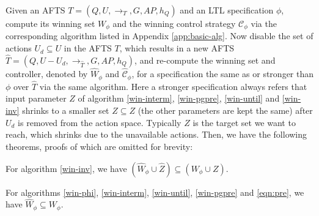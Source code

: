 Given an AFTS $ T = (Q,U,\rightarrow_T,G,AP,h_Q) $ and an LTL specification $ \phi $, compute its winning set $ W_{\phi} $ and the winning control strategy $ \mathcal{C}_{\phi} $  via the corresponding algorithm listed in Appendix \ref{app:basic-alg}. Now disable the set of actions $ U_d \subseteq U$ in the AFTS $ T $, which results in a new AFTS $ \widehat{T} = (Q,U-U_d,\rightarrow_{\widehat{T}},G,AP,h_Q) $, and re-compute the winning set and controller, denoted by $ \widehat{W}_{\phi} $ and $ \widehat{\mathcal{C}}_{\phi} $, for a specification the same as or stronger than $ \phi $ over $ \widehat{T} $ via the same algorithm. Here a stronger specification always refers that input parameter $ Z $ of algorithm \eqref{win-interm}, \eqref{win-pgpre}, \eqref{win-until} and  \eqref{win-inv} shrinks to a smaller set $ \widehat{Z}\subseteq Z $ (the other parameters are kept the same) after $ U_d $ is removed from the action space. Typically $ Z $ is the target set we want to reach, which shrinks due to the unavailable actions. 
Then, we have the following theorems, proofs of which are omitted for brevity:

\begin{theorem}
For algorithm \eqref{win-inv}, we have $ ( \widehat{W}_{\phi}\cup \widehat{Z}) \subseteq ( W_\phi \cup Z) $.\label{thm: inv-set}
\end{theorem}


\begin{theorem}
For algorithms \eqref{win-phi}, \eqref{win-interm}, \eqref{win-until}, \eqref{win-pgpre} and \eqref{eqn:pre}, we have $ \widehat{W}_\phi \subseteq W_\phi $.

	\label{thm: 1} 
\end{theorem}

